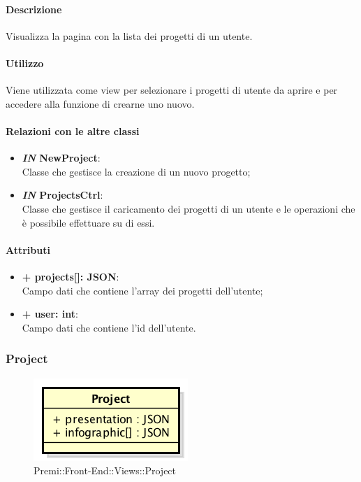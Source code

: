 	\paragraph{Descrizione}
	Visualizza la pagina con la lista dei progetti di un utente.
	
	\paragraph{Utilizzo}
	Viene utilizzata come view per selezionare i progetti di utente da aprire e per accedere alla funzione di crearne uno nuovo.
	
	\paragraph{Relazioni con le altre classi}
	\begin{itemize}
		\item \textbf{\textit{IN} NewProject}:\\
			Classe che gestisce la creazione di un nuovo progetto;
		\item \textbf{\textit{IN} ProjectsCtrl}:\\
			Classe che gestisce il caricamento dei progetti di un utente e le operazioni che è possibile effettuare su di essi.
	\end{itemize}
	
	\paragraph{Attributi}
	\begin{itemize}
		\item \textbf{+ projects[]: JSON}:\\
			Campo dati che contiene l'array dei progetti dell'utente;
		\item \textbf{+ user: int}:\\
			Campo dati che contiene l'id dell'utente.
	\end{itemize}
	
	
\subsubsection{Project}
	\begin{figure}[h]
		\centering
		\includegraphics[width=0.3\linewidth]{img/premi_front_end_views_project}
		\caption[Premi::Front-End::Views::Project]{Premi::Front-End::Views::Project}
	\end{figure}
	
